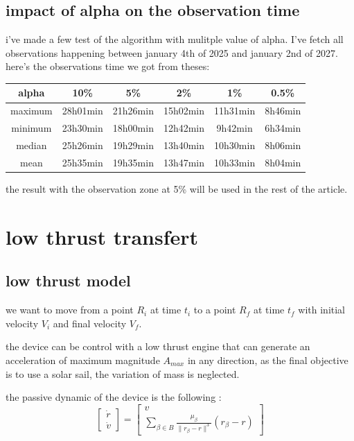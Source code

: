 \documentclass{article} %
\begin{document}
		\subsection{impact of alpha on the observation time}
		
		i've made a few test of the algorithm with mulitple value of alpha. I've fetch all observations happening between january 4th of 2025 and january 2nd of 2027. here's the observations time we got from theses:  
		\begin{center}
			\begin{tabular}{||c||c c c c c||} 
				\hline
				alpha & 10\% & 5\% & 2\% &1\% & 0.5\% \\ [0.5ex] 
				\hline\hline
				maximum & 28h01min & 21h26min & 15h02min &11h31min & 8h46min \\ 
				\hline
				minimum & 23h30min & 18h00min & 12h42min &9h42min& 6h34min \\
				\hline
				median & 25h26min & 19h29min & 13h40min &10h30min& 8h06min\\
				\hline
				mean & 25h35min & 19h35min & 13h47min &10h33min& 8h04min\\ 
				\hline
			\end{tabular}
		\end{center}
		
		the result with the observation zone at 5\% will be used in the rest of the article.
		
		\section{low thrust transfert}
			
			\subsection{low thrust model}
			
			we want to move from a point $R_i$ at time $t_i$ to a point $R_f$ at time $t_f$ with initial velocity $V_i$ and final velocity $V_f$.
			
			the device can be control with a low thrust engine that can generate an acceleration of maximum magnitude $A_{max}$ in any direction, as the final objective is to use a solar sail, the variation of mass is neglected.
			
			the passive dynamic of the device is the following : 
			$$
			\begin{bmatrix}
				\dot{r}\\
				\dot{v}
			\end{bmatrix} =\begin{bmatrix}
				v\\
				\sum\limits _{\beta \in B }\frac{\mu _{\beta }}{\| r_{\beta } -r\| ^{3}}( r_{\beta } -r)
			\end{bmatrix}
			$$
			
\end{document}
